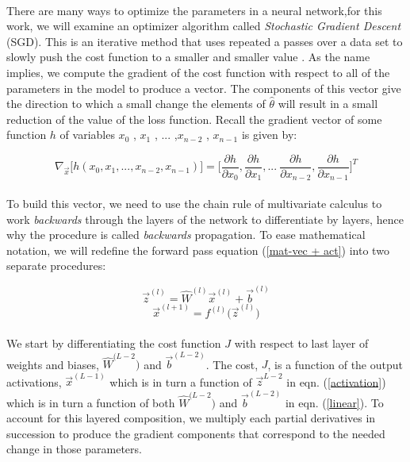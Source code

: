 \documentclass[12pt,letterpaper]{article}
\begin{document}
\paragraph*{}There are many ways to optimize the parameters in a neural network,for this work, we will examine an optimizer algorithm called \textit{Stochastic Gradient Descent} (SGD). This is an iterative method that uses repeated a passes over a data set to slowly push the cost function to a smaller and smaller value \cite{Geron,Goodfellow,Loy}. As the name implies, we compute the gradient of the cost function with respect to all of the parameters in the model to produce a vector. The components of this vector give the direction to which a small change the elements of $\hat{\theta}$ will result in a small reduction of the value of the loss function. Recall the gradient vector of some function $h$ of variables $x_0$ , $x_1$ , ... ,$x_{n-2}$ , $x_{n-1}$ is given by:

\begin{equation}
\label{gradient}
\nabla_{\vec{x}}\Big[ h(x_0,x_1,...,x_{n-2},x_{n-1}) \Big] 
			= \Big[ \frac{\partial h}{\partial x_0} , \frac{\partial h}{\partial x_1} , ...\
					\frac{\partial h}{\partial x_{n-2}} , \frac{\partial h}{\partial x_{n-1}} \Big]^T
\end{equation}

\paragraph*{}To build this vector, we need to use the chain rule of multivariate calculus to work \textit{backwards} through the layers of the network to differentiate by layers, hence why the procedure is called \textit{backwards} propagation. To ease mathematical notation, we will redefine the forward pass equation (\ref{mat-vec + act}) into two separate procedures:

\begin{equation}
\label{linear}
\vec{z}^{(l)} = \hat{W}^{(l)} \vec{x}^{(l)} + \vec{b}^{(l)}
\end{equation}
\begin{equation}
\label{activation}
\vec{x}^{(l+1)} = f^{(l)} \big( \vec{z}^{(l)} \big)
\end{equation}

\paragraph*{}We start by differentiating the cost function $J$ with respect to last layer of weights and biases, $\hat{W}^{(L-2})$ and $\vec{b}^{(L-2)}$. The cost, $J$, is a function of the output activations, $\vec{x}^{(L-1)}$ which is in turn a function of $\vec{z}^{L-2}$ in eqn. (\ref{activation}) which is in turn a function of both $\hat{W}^{(L-2})$ and $\vec{b}^{(L-2)}$ in eqn. (\ref{linear}). To account for this layered composition, we multiply each partial derivatives in succession to produce the gradient components that correspond to the needed change in those parameters.
\end{document}

